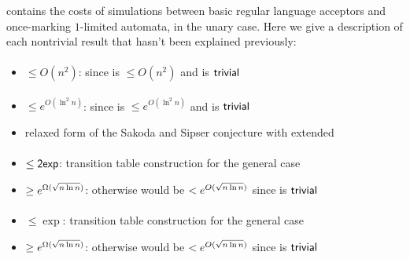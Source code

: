  contains the costs of simulations between basic regular language acceptors and once-marking $1$-limited automata, in the unary case.
Here we give a description of each nontrivial result that hasn't been explained previously:

\paragraph{\ONFA{}\tto\OMODLA}\label{cost:1NFAtoOM1DLAu}
\begin{itemize}
	\item $\le O(n^2)$: since \hyperref[cost:1NFAto2DFAu]{\ONFA{}\tto\TDFA} is $\le O(n^2)$ and \TDFA{}\tto\OMODLA is $\mathsf{trivial}$
\end{itemize}
\paragraph{\TNFA{}\tto\OMODLA}
\begin{itemize}
	\item $\le e^{O(\ln^2n)}$: since \hyperref[cost:2NFAto2DFAu]{\TNFA{}\tto\TDFA} is $\le e^{O(\ln^2n)}$ and \TDFA{}\tto\OMODLA is $\mathsf{trivial}$
	\item relaxed form of the Sakoda and Sipser conjecture with extended \TDFA
\end{itemize}
\paragraph{\OMOLA{}\tto\ODFA}
\begin{itemize}
	\item $\le\mathsf{2exp}$: transition table construction for the general case \cite{PigPis14}
	\item $\ge e^{\Omega(\sqrt{n\ln n})}$: otherwise \hyperref[cost:2DFAto1DFAu]{\TDFA{}\tto\ODFA} would be $<e^{O(\sqrt{n\ln n})}$ since \TDFA{}\tto\OMOLA is $\mathsf{trivial}$
\end{itemize}
\paragraph{\OMOLA{}\tto\ONFA}\label{cost:OM1LAto1NFAu}
\begin{itemize}
	\item $\le\exp$: transition table construction for the general case \cite{PigPis14}
	\item $\ge e^{\Omega(\sqrt{n\ln n})}$: otherwise \hyperref[cost:2DFAto1NFAu]{\TDFA{}\tto\ONFA} would be $<e^{O(\sqrt{n\ln n})}$ since \TDFA{}\tto\OMOLA is $\mathsf{trivial}$
\end{itemize}
